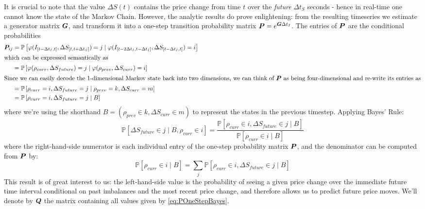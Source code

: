 It is crucial to note that the value $\Delta S(t)$ contains the price change from time $t$ over the \textit{future} $\Delta t_S$ seconds - hence in real-time one cannot know the state of the Markov Chain. However, the analytic results do prove enlightening: from the resulting timeseries we estimate a generator matrix $\boldsymbol{G}$, and transform it into a one-step transition probability matrix $\boldsymbol{P} = e^{\boldsymbol{G}\Delta t_I}$. The entries of $\boldsymbol{P}$ are the conditional probabilities 
\begin{align}
\boldsymbol{P}_{ij} & = \mathbb{P}\left[ \varphi( I_{[t-\Delta t_I, t]}, \Delta S_{[t,t+\Delta t_S]}) = j \; | \; \varphi( I_{[t-2\Delta t_I, t-\Delta t_I]}, \Delta S_{[t-\Delta t_I, t]} ) = i \right] \label{eq:POneStepUgly} \\
\intertext{which can be expressed semantically as}
& = \mathbb{P}\left[ \varphi( \rho_{curr}, \Delta S_{future}) = j \; | \; \varphi( \rho_{prev}, \Delta S_{curr} ) = i \right] \label{eq:POneStepNice} \\
\intertext{Since we can easily decode the 1-dimensional Markov state back into two dimensions, we can think of $\boldsymbol{P}$ as being four-dimensional and re-write its entries as}
& = \mathbb{P}\left[ \rho_{curr} = i,  \Delta S_{future} = j \; | \; \rho_{prev} = k, \Delta S_{curr} = m \right] \\
& = \mathbb{P}\left[ \rho_{curr} = i,  \Delta S_{future} = j \; | \; B \right]
\end{align}
where we're using the shorthand $B = (\rho_{prev} \in k, \Delta S_{curr} \in m)$ to represent the states in the previous timestep. Applying Bayes' Rule:
\begin{equation}\label{eq:POneStepBayes}
\mathbb{P}\left[ \Delta S_{future} \in j \; | \; B, \rho_{curr} \in i \right] = \dfrac{\mathbb{P}\left[ \rho_{curr} \in i, \Delta S_{future} \in j \; | \; B \right]}{\mathbb{P}\left[ \rho_{curr} \in i \; | \; B \right]}
\end{equation}
where the right-hand-side numerator is each individual entry of the one-step probability matrix $\boldsymbol{P}$, and the denominator can be computed from $\boldsymbol{P}$ by:
\begin{equation}\label{eq:POneStepBayesDenom}
\mathbb{P}\left[ \rho_{curr} \in i \; | \; B \right] = \sum\limits_j \mathbb{P}\left[ \rho_{curr} \in i,  \Delta S_{future} \in j \; | \; B \right]
\end{equation}
This result is of great interest to us: the left-hand-side value is the probability of seeing a given price change over the immediate future time interval conditional on past imbalances and the most recent price change, and therefore allows us to predict future price moves. We'll denote by $\boldsymbol{Q}$ the matrix containing all values given by \eqref{eq:POneStepBayes}.

